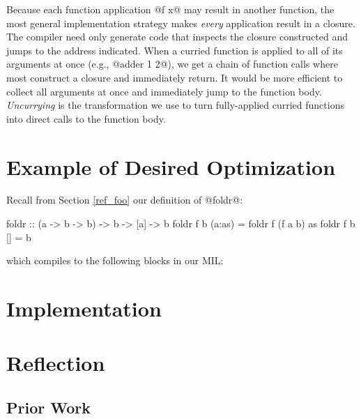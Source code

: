 \documentclass[12pt]{report}
\begin{document}
Because each function application @f x@ may result in another
function, the most general implementation strategy makes \emph{every}
application result in a closure. The compiler need only generate code
that inspects the closure constructed and jumps to the address
indicated. When a curried function is applied to all of its arguments
at once (e.g., @adder 1 2@), we get a chain of function calls where
most construct a closure and immediately return. It would be more
efficient to collect all arguments at once and immediately jump to the
function body. \emph{Uncurrying} is the transformation we use to turn 
fully-applied curried functions into direct calls to the function body.



\section{Example of Desired Optimization}

Recall from Section \ref{ref_foo} our definition of @foldr@:

\begin{code}
foldr :: (a -> b -> b) -> b -> [a] -> b
foldr f b (a:as) = foldr f (f a b) as
foldr f b []     = b
\end{code}

which compiles to the following blocks in our MIL:

\begin{code}

\end{code}

\section{Implementation}
\section{Reflection}
\subsection{Prior Work}
\end{document}
